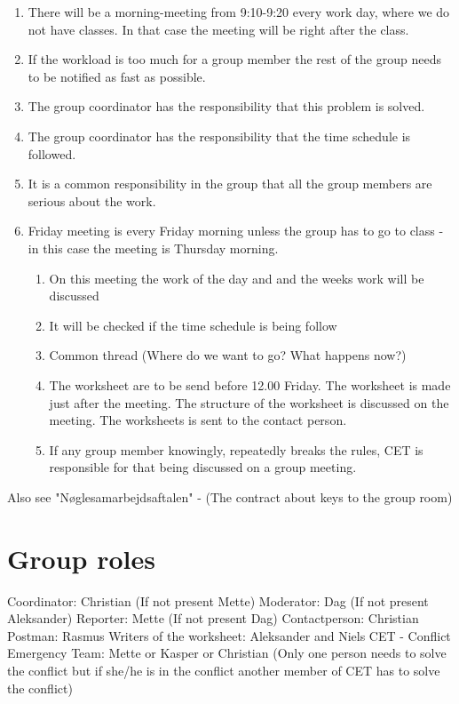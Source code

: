 \begin{enumerate}
\item There will be a morning-meeting from 9:10-9:20 every work day, where we do not have classes. In that case the meeting will be right after the class.
\item If the workload is too much for a group member the rest of the group needs to be notified as fast as possible.
\item The group coordinator has the responsibility that this problem is solved. 
\item The group coordinator has the responsibility that the time schedule is followed.
\item It is a common responsibility in the group that all the group members are serious about the work.
\item Friday meeting is every Friday morning unless the group has to go to class - in this case the meeting is Thursday morning. 		\begin{enumerate}
	\item On this meeting the work of the day and and the weeks work will be discussed 
\item It will be checked if the time schedule is being follow 
\item Common thread (Where do we want to go? What happens now?) 
\item The worksheet are to be send before 12.00 Friday. The worksheet is made just after the meeting. The structure of the worksheet is discussed on the meeting. The worksheets is sent to the contact person.
\item If any group member knowingly, repeatedly breaks the rules, CET is responsible for that being discussed on a group meeting.  
\end{enumerate}
\end{enumerate}

Also see "Nøglesamarbejdsaftalen" - (The contract about keys to the group room)

\section*{Group roles}

Coordinator: Christian (If not present Mette)
\newline
\newline
Moderator: Dag (If not present Aleksander)
\newline
\newline
Reporter: Mette (If not present Dag)
\newline
\newline
Contactperson: Christian
\newline
\newline
Postman: Rasmus
\newline
\newline
Writers of the worksheet: Aleksander and Niels
\newline
\newline
CET - Conflict Emergency Team: Mette or Kasper or Christian (Only one person needs to solve the conflict but if she/he is in the conflict another member of CET has to solve the conflict)